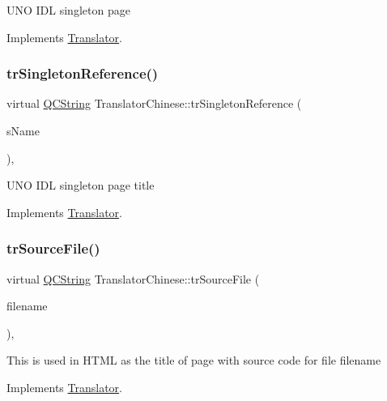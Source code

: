 U\+NO I\+DL singleton page 

Implements \mbox{\hyperlink{class_translator}{Translator}}.

\mbox{\label{class_translator_chinese_a75d26d62856fec425adc3c89983c1b24}} 
\subsubsection{\texorpdfstring{trSingletonReference()}{trSingletonReference()}}
{\footnotesize\ttfamily virtual \mbox{\hyperlink{class_q_c_string}{Q\+C\+String}} Translator\+Chinese\+::tr\+Singleton\+Reference (\begin{DoxyParamCaption}\item[{const char $\ast$}]{s\+Name }\end{DoxyParamCaption})\hspace{0.3cm}{\ttfamily [inline]}, {\ttfamily [virtual]}}

U\+NO I\+DL singleton page title 

Implements \mbox{\hyperlink{class_translator}{Translator}}.

\mbox{\label{class_translator_chinese_ad5a765d26a7fe9bda8830f9641ab80eb}} 
\subsubsection{\texorpdfstring{trSourceFile()}{trSourceFile()}}
{\footnotesize\ttfamily virtual \mbox{\hyperlink{class_q_c_string}{Q\+C\+String}} Translator\+Chinese\+::tr\+Source\+File (\begin{DoxyParamCaption}\item[{\mbox{\hyperlink{class_q_c_string}{Q\+C\+String}} \&}]{filename }\end{DoxyParamCaption})\hspace{0.3cm}{\ttfamily [inline]}, {\ttfamily [virtual]}}

This is used in H\+T\+ML as the title of page with source code for file filename 

Implements \mbox{\hyperlink{class_translator}{Translator}}.

